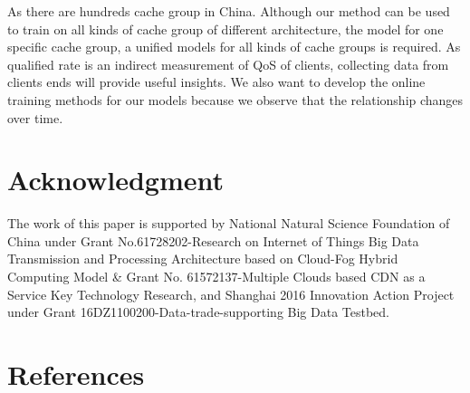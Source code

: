 \documentclass[5p]{elsarticle}
\begin{document}
As there are hundreds cache group in China. Although our method can be used to train on all kinds of cache group of different architecture, the model for one specific cache group, a unified models for all kinds of cache groups is required. As qualified rate is an indirect measurement of QoS of clients, collecting data from clients ends will provide useful insights. We also want to develop the online training methods for our models because we observe that the relationship changes over time.

\section{Acknowledgment}
The work of this paper is supported by National Natural Science Foundation of China under Grant No.61728202-Research on Internet of Things Big Data Transmission and Processing Architecture based on Cloud-Fog Hybrid Computing Model & Grant No. 61572137-Multiple Clouds based CDN as a Service Key Technology Research, and Shanghai 2016 Innovation Action Project under Grant 16DZ1100200-Data-trade-supporting Big Data Testbed.


\section*{References}


\end{document}
